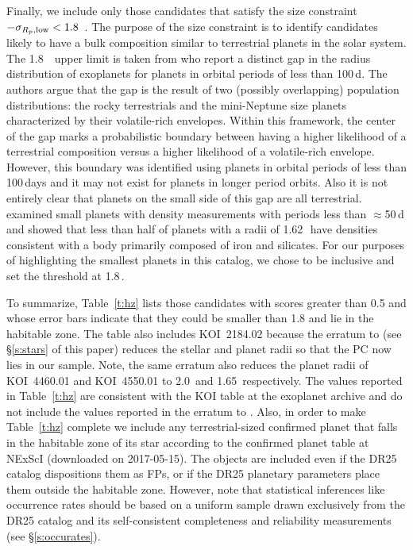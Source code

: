 Finally, we include only those candidates that satisfy the size constraint \rp~$- \sigma_{{R_p}\rm,low} < 1.8$~\re.  The purpose of the size constraint is to identify candidates likely to have a bulk composition similar to terrestrial planets in the solar system.  The 1.8~\re\ upper limit is taken from \citet{Fulton2017} who report a distinct gap in the radius distribution of exoplanets for planets in orbital periods of less than 100\,d.  The authors argue that the gap is the result of two (possibly overlapping) population distributions: the rocky terrestrials and the mini-Neptune size planets characterized by their volatile-rich envelopes.  Within this framework, the center of the gap marks a probabilistic boundary between having a higher likelihood of a terrestrial composition versus a higher likelihood of a volatile-rich envelope.  However, this boundary was identified using planets in orbital periods of less than 100\,days and it may not exist for planets in longer period orbits. Also it is not entirely clear that planets on the small side of this gap are all terrestrial. \citet{Rogers2015} examined small planets with density measurements with periods less than $\approx$50\,d and showed that less than half of planets with a radii of 1.62\,\re\ have densities consistent with a body primarily composed of iron and silicates.  For our purposes of highlighting the smallest planets in this catalog, we chose to be inclusive and set the threshold at 1.8\,\re.


To summarize, Table~\ref{t:hz} lists those candidates with scores greater than 0.5 and whose error bars indicate that they could be smaller than 1.8 \re{} and lie in the habitable zone. The table also includes KOI~2184.02 because the erratum to \citet{Mathur2017ApJS} (see \S\ref{s:stars} of this paper) reduces the stellar and planet radii so that the PC now lies in our sample. Note, the same erratum also reduces the planet radii of KOI~4460.01 and KOI~4550.01 to 2.0\,\re{} and 1.65\,\re{} respectively. The values reported in Table~\ref{t:hz} are consistent with the KOI table at the exoplanet archive and do not include the values reported in the erratum to \citet{Mathur2017ApJS}. Also, in order to make Table~\ref{t:hz} complete we include any \Kepler{} terrestrial-sized confirmed planet that falls in the habitable zone of its star according to the confirmed planet table at NExScI (downloaded on 2017-05-15). The objects are included even if the DR25 catalog dispositions them as FPs, or if the DR25 planetary parameters place them outside the habitable zone. However, note that statistical inferences like occurrence rates should be based on a uniform sample drawn exclusively from the DR25 catalog and its self-consistent completeness and reliability measurements (see \S\ref{s:occurates}).  

